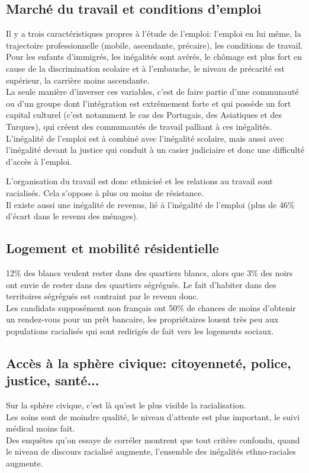 \documentclass[12pt, a4paper, openany]{book}
\begin{document}
\subsection{Marché du travail et conditions d'emploi}

Il y a trois caractéristiques propres à l'étude de l'emploi: l'emploi en lui même, la trajectoire professionnelle (mobile, ascendante, précaire), les conditions de travail. \\
Pour les enfants d'immigrés, les inégalités sont avérés, le chômage est plus fort en cause de la discrimination scolaire et à l'embauche, le niveau de précarité est supérieur, la carrière moins ascendante. \\
La seule manière d'inverser ces variables, c'est de faire partie d'une communauté ou d'un groupe dont l'intégration est extrêmement forte et qui possède un fort capital culturel (c'est notamment le cas des Portugais, des Asiatiques et des Turques), qui créent des communautés de travail palliant à ces inégalités. \\
L'inégalité de l'emploi est à combiné avec l'inégalité scolaire, mais aussi avec l'inégalité devant la justice qui conduit à un casier judiciaire et donc une difficulté d'accès à l'emploi.


L'organisation du travail est donc ethnicisé et les relations au travail sont racialisés. Cela s'oppose à plus ou moins de résistance. \\
Il existe aussi une inégalité de revenus, lié à l'inégalité de l'emploi (plus de 46\% d'écart dans le revenu des ménages). \\


\subsection{Logement et mobilité résidentielle}

12\% des blancs veulent rester dans des quartiers blancs, alors que 3\% des noirs ont envie de rester dans des quartiers ségrégués. Le fait d'habiter dans des territoires ségrégués est contraint par le revenu donc. \\
Les candidats supposément non français ont 50\% de chances de moins d'obtenir un rendez-vous pour un prêt bancaire, les propriétaires louent très peu aux populations racialisés qui sont redirigés de fait vers les logements sociaux. 

\subsection{Accès à la sphère civique: citoyenneté, police, justice, santé...}

Sur la sphère civique, c'est là qu'est le plus visible la racialisation. \\
Les soins sont de moindre qualité, le niveau d'attente est plus important, le suivi médical moins fait. \\
Des enquêtes qu'on essaye de corréler montrent que tout critère confondu, quand le niveau de discours racialisé augmente, l'ensemble des inégalités ethno-raciales augmente. 
\end{document}
